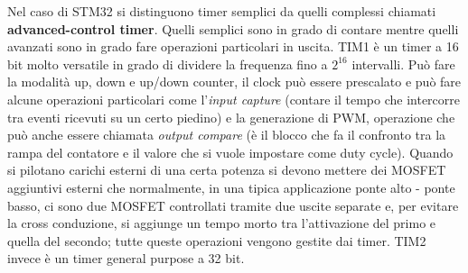 \documentclass[12pt, a4paper]{report}
\begin{document}
Nel caso di STM32 si distinguono timer semplici da quelli complessi chiamati \textbf{advanced-control timer}. Quelli semplici sono in grado di contare mentre quelli avanzati sono in grado fare operazioni particolari in uscita. TIM1 è un timer a 16 bit molto versatile in grado di dividere la frequenza fino a $2^{16}$ intervalli. Può fare la modalità up, down e up/down counter, il clock può essere prescalato e può fare alcune operazioni particolari come l'\textit{input capture} (contare il tempo che intercorre tra eventi ricevuti su un certo piedino) e la generazione di PWM, operazione che può anche essere chiamata \textit{output compare} (è il blocco che fa il confronto tra la rampa del contatore e il valore che si vuole impostare come duty cycle). Quando si pilotano carichi esterni di una certa potenza si devono mettere dei MOSFET aggiuntivi esterni che normalmente, in una tipica applicazione ponte alto - ponte basso, ci sono due MOSFET controllati tramite due uscite separate e, per evitare la cross conduzione, si aggiunge un tempo morto tra l'attivazione del primo e quella del secondo; tutte queste operazioni vengono gestite dai timer. TIM2 invece è un timer general purpose a 32 bit.
\end{document}

